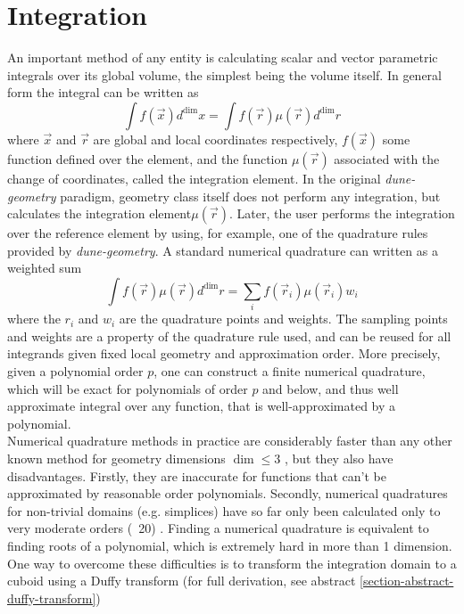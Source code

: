 \section{Integration}
\label{sec:theory:integration}

An important method of any entity is calculating scalar and vector parametric integrals over its global volume, the simplest being the volume itself. In general form the integral can be written as
\[ \int f(\vec{x}) d^{\dim} x = \int f(\vec{r}) \mu(\vec{r}) d^{\dim} r \]
where $\vec{x}$ and $\vec{r}$ are global and local coordinates respectively, $f(\vec{x})$ some function defined over the element, and the function $\mu(\vec{r})$ associated with the change of coordinates, called the integration element. In the original \textit{dune-geometry} paradigm, geometry class itself does not perform any integration, but calculates the integration element$\mu(\vec{r})$. Later, the user performs the integration over the reference element by using, for example, one of the quadrature rules\cite{abramowitz+1970} provided by \textit{dune-geometry}. A standard numerical quadrature can written as a weighted sum
\[ \int f(\vec{r}) \mu(\vec{r}) d^{\dim} r = \sum_i f(\vec{r}_i) \mu(\vec{r}_i) w_i  \]
where the $r_i$ and $w_i$ are the quadrature points and weights. The sampling points and weights are a property of the quadrature rule used, and can be reused for all integrands given fixed local geometry and approximation order. More precisely, given a polynomial order $p$, one can construct a finite numerical quadrature, which will be exact for polynomials of order $p$ and below, and thus well approximate integral over any function, that is well-approximated by a polynomial. \\

\noindent
Numerical quadrature methods in practice are considerably faster than any other known method for geometry dimensions $\dim \leq 3$ \cite{schurer2003}, but they also have disadvantages. Firstly, they are inaccurate for functions that can't be approximated by reasonable order polynomials. Secondly, numerical quadratures for non-trivial domains (e.g. simplices) have so far only been calculated only to very moderate orders (~20) \cite{zhang+2008}. Finding a numerical quadrature is equivalent to finding roots of a polynomial, which is extremely hard in more than 1 dimension. One way to overcome these difficulties is to transform the integration domain to a cuboid using a Duffy transform (for full derivation, see abstract \ref{section-abstract-duffy-transform})

